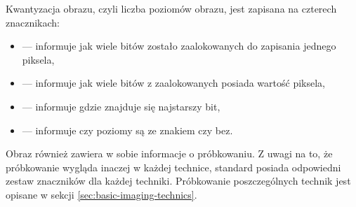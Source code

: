 \dicomRetired

\par
Kwantyzacja obrazu, czyli liczba poziomów obrazu, jest zapisana na czterech znacznikach:
\begin{itemize}
    \item {} --- informuje jak wiele bitów zostało zaalokowanych do zapisania jednego piksela,
    \item {} --- informuje jak wiele bitów z zaalokowanych posiada wartość piksela,
    \item {} --- informuje gdzie znajduje się najstarszy bit,
    \item {} --- informuje czy poziomy są ze znakiem czy bez.
\end{itemize}

\par
Obraz \DICOM również zawiera w sobie informacje o próbkowaniu.
Z uwagi na to, że próbkowanie wygląda inaczej w każdej technice, standard posiada odpowiedni zestaw znaczników dla każdej techniki.
Próbkowanie poszczególnych technik jest opisane w sekcji \ref{sec:basic-imaging-technics}.







